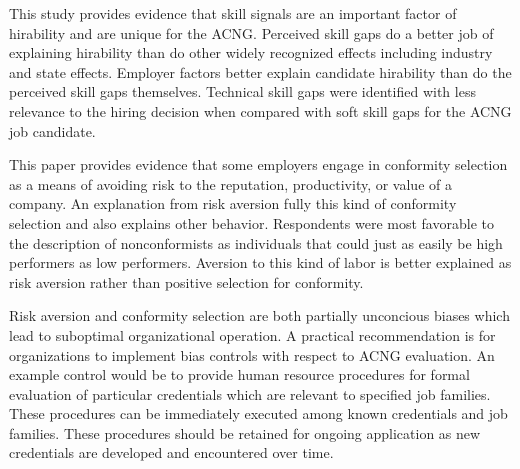 \documentclass[review]{elsarticle}
\begin{document}
This study provides evidence that skill signals are an important factor of hirability and are unique for the ACNG.
Perceived skill gaps do a better job of explaining hirability than do other widely recognized effects including industry and state effects.
Employer factors better explain candidate hirability than do the perceived skill gaps themselves.
Technical skill gaps were identified with less relevance to the hiring decision when compared with soft skill gaps for the ACNG job candidate.

This paper provides evidence that some employers engage in conformity selection as a means of avoiding risk to the reputation, productivity, or value of a company.
An explanation from risk aversion fully this kind of conformity selection and also explains other behavior.
Respondents were most favorable to the description of nonconformists as individuals that could just as easily be high performers as low performers.
Aversion to this kind of labor is better explained as risk aversion rather than positive selection for conformity.

Risk aversion and conformity selection are both partially unconcious biases which lead to suboptimal organizational operation.
A practical recommendation is for organizations to implement bias controls with respect to ACNG evaluation.
An example control would be to provide human resource procedures for formal evaluation of particular credentials which are relevant to specified job families.
These procedures can be immediately executed among known credentials and job families.
These procedures should be retained for ongoing application as new credentials are developed and encountered over time.
\end{document}
